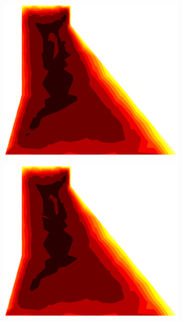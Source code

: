 \documentclass[10pt, a4paper]{article}
\begin{document}
\begin{figure}[H]
\begin{subfigure}[H]{0.19\textwidth}
		\includegraphics[width=1.2\textwidth]{fig/24.eps}
	\end{subfigure}
		\begin{subfigure}[H]{0.19\textwidth}
		\includegraphics[width=1.2\textwidth]{fig/25.eps}
	\end{subfigure}
	\begin{subfigure}[H]{0.19\textwidth}

\end{subfigure}
\end{figure}
\end{document}
